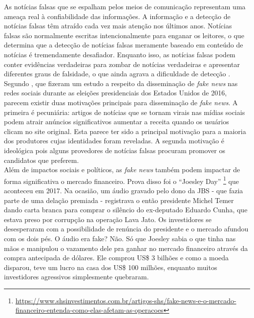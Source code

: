 

As notícias falsas que se espalham pelos meios de comunicação representam uma ameaça real à confiabilidade das informações.
A informação e a detecção de notícias falsas têm atraído cada vez mais atenção nos últimos anos. Notícias falsas
são normalmente escritas intencionalmente para enganar os leitores, o que determina que a detecção de notícias falsas
meramente baseado em conteúdo de notícias é tremendamente desafiador. Enquanto isso, as notícias falsas podem
conter evidências verdadeiras para zombar de notícias verdadeiras e apresentar diferentes graus de falsidade, o que ainda
agrava a dificuldade de detecção \cite{karimi2018}. \\

Segundo \cite{allcot2017}, que fizeram um estudo a respeito da disseminação de \textit{fake news} nas redes sociais durante as eleições presidenciais dos Estados Unidos de 2016, parecem existir duas motivações principais para disseminação de \textit{fake news}. A primeira é pecuniária: artigos de notícias que se tornam virais nas mídias sociais podem atrair anúncios significativos aumentar a receita quando os usuários clicam no site original. 
Esta parece ter sido a principal motivação para a maioria dos produtores cujas identidades foram reveladas. 
A segunda motivação é ideológica pois alguns provedores de notícias falsas procuram promover os candidatos que preferem. \\

Além de impactos sociais e políticos, as \textit{fake news} também podem impactar de forma significativa o mercado financeiro. Prova disso foi o ``Joesley Day'' \footnote{\url{https://www.shsinvestimentos.com.br/artigos-shs/fake-news-e-o-mercado-financeiro-entenda-como-elas-afetam-as-operacoes}} que aconteceu em 2017. Na ocasião, um áudio gravado pelo dono da JBS - que fazia parte de uma delação premiada - registrava o então presidente Michel Temer dando carta branca para comprar o silêncio do ex-deputado Eduardo Cunha, que estava preso por corrupção na operação Lava Jato. Os investidores se desesperaram com a possibilidade de renúncia do presidente e o mercado afundou com os dois pés. O áudio era fake? Não. Só que Joesley sabia o que tinha nas mãos e manipulou o vazamento dele pra ganhar no mercado financeiro através da compra antecipada de dólares. Ele comprou US\$ 3 bilhões e como a moeda disparou, teve um lucro na casa dos US\$ 100 milhões, enquanto muitos investidores agressivos simplesmente quebraram.

